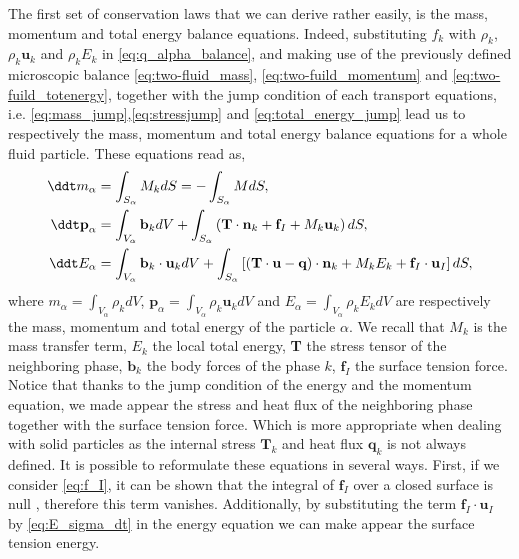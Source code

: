 The first set of conservation laws that we can derive rather easily, is  the mass, momentum and total energy balance equations. 
Indeed, substituting $f_k$ with $\rho_k$, $\rho_k \textbf{u}_k$ and $\rho_k E_k$  in \ref{eq:q_alpha_balance}, and making use of the previously defined microscopic balance \ref{eq:two-fluid_mass}, \ref{eq:two-fuild_momentum} and \ref{eq:two-fuild_totenergy}, together with the jump condition of each transport equations, i.e. \ref{eq:mass_jump},\ref{eq:stressjump} and \ref{eq:total_energy_jump} lead us to respectively the mass, momentum and total energy balance equations for a whole fluid particle.
These equations read as,
\begin{align}
    \label{eq:dt_m_alpha}
    \ddt m_\alpha 
    &= \int_{S_\alpha} M_k dS
    = - \int_{S_\alpha} M dS, \\
    \label{eq:dt_p_alpha}
    \ddt \textbf{p}_\alpha 
    &= \int_{V_\alpha} \textbf{b}_k dV
    + \int_{S_\alpha} \left(
    \textbf{T}\cdot\textbf{n}_k
    + \textbf{f}_I 
    + M_k \textbf{u}_k
    \right)dS, \\
    \label{eq:dt_e_alpha}
    \ddt E_\alpha 
    &= \int_{V_\alpha} \textbf{b}_k \cdot \textbf{u}_k dV 
    + \int_{S_\alpha} \left[
        (\textbf{T}\cdot \textbf{u} 
    - \textbf{q})\cdot\textbf{n}_k 
    + M_k E_k 
    + \textbf{f}_I \cdot \textbf{u}_I 
    \right]dS, 
\end{align}
where $m_\alpha =  \int_{V_\alpha} \rho_k dV$, $\textbf{p}_\alpha= \int_{V_\alpha} \rho_k \textbf{u}_k dV$ and $E_\alpha= \int_{V_\alpha} \rho_kE_k dV$ are respectively the mass, momentum and total energy of the particle $\alpha$. 
We recall that $M_k$ is the mass transfer term, $E_k$ the local total energy, \textbf{T} the stress tensor of the neighboring phase, $\textbf{b}_k$ the body forces of the phase $k$, $\textbf{f}_I$ the surface tension force. 
Notice that thanks to the jump condition of the energy and the momentum equation, we made appear the stress and heat flux of the neighboring phase together with the surface tension force. 
Which is more appropriate when dealing with solid particles as the internal stress $\textbf{T}_k$ and heat flux $\textbf{q}_k$ is not always defined. 
It is possible to reformulate these equations in several ways. 
First, if we consider \ref{eq:f_I}, it can be shown that the integral of $\textbf{f}_I$ over a closed surface is null \citep[Appendix B]{tryggvason2011direct}, therefore this term vanishes.
Additionally, by substituting the term $\textbf{f}_I \cdot \textbf{u}_I$ by \ref{eq:E_sigma_dt} in the energy equation we can make appear the surface tension energy.  

